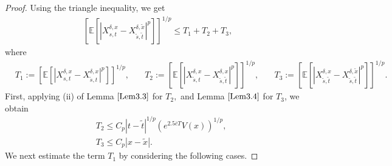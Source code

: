 \documentclass[11pt]{article}
\theoremstyle{theorem}
\theoremstyle{definition}
\newcommand{\bR}{\mathbb{R}}
\newcommand{\1}{{\bf 1}}
\begin{document}
\begin{proof}
 
Using the triangle inequality, we get
\begin{align}
\left[\mathbb{E}\left[\left|X^{\delta, x}_{s,t}-X^{\delta, \widetilde{x}}_{\widetilde{s},\widetilde{t}}\right|^p\right]\right]^{1/p}
 \le  T_1+ T_2+ T_3,
 \label{t1234}
\end{align}
where 
\begin{align*}
   &T_1:= \left[\mathbb{E}\left[\left|X^{\delta, x}_{s,t} - X^{\delta, x}_{\widetilde{s},t}\right|^p\right]\right]^{1/p}, \quad 
   &T_2:= \left[\mathbb{E}\left[\left| X^{\delta, x}_{\widetilde{s},t} - X^{\delta, x}_{\widetilde{s},  \widetilde{t}}\right|^p\right]\right]^{1/p}, \quad 
   &T_3:= \left[\mathbb{E}\left[\left|  X^{\delta, x}_{\widetilde{s}, \widetilde{t}}- X^{\delta, \widetilde{x}}_{\widetilde{s},  \widetilde{t}}\right|^p\right]\right]^{1/p}.
\end{align*}
 First, applying (ii) of Lemma $\ref{Lem3.3}$ for $T_2,$ and Lemma $\ref{Lem3.4}$ for $T_3$, we obtain
 \begin{align}
  &T_2 \le C_p | t- \widetilde{t} |^{1/p} (e^{2.5\overline{c}T}V(x))^{1/p} ,  \label{iii3}\\
     &T_3 \le C_p |x-\widetilde{x}|.\label{iii4}
\end{align}
We next estimate the term $T_1$ by considering the following cases.


\end{proof}
\end{document}
